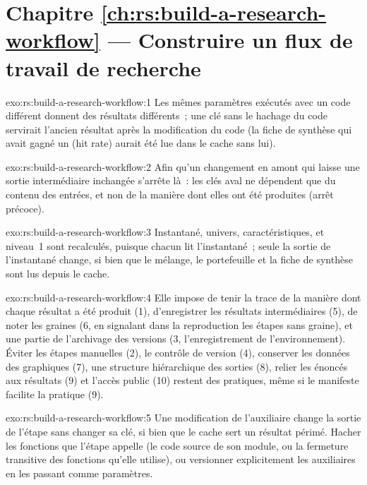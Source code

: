 \section*{Chapitre \ref{ch:rs:build-a-research-workflow} --- Construire un flux de travail de recherche}

\begin{solution}{exo:rs:build-a-research-workflow:1}
Les mêmes paramètres exécutés avec un code différent donnent des résultats différents~; une clé sans le hachage du code servirait l'ancien résultat après la modification du code (la
fiche de synthèse qui avait gagné un  (hit rate) aurait été lue dans le cache sans lui).
\end{solution}

\begin{solution}{exo:rs:build-a-research-workflow:2}
Afin qu'un changement en amont qui laisse une sortie intermédiaire inchangée s'arrête là~: les clés aval ne dépendent que du contenu des entrées, et non de la manière
dont elles ont été produites (arrêt précoce).
\end{solution}

\begin{solution}{exo:rs:build-a-research-workflow:3}
Instantané, univers, caractéristiques,  et niveau~1 sont recalculés, puisque chacun lit l'instantané~; seule la sortie de l'instantané change, si bien que le mélange, le portefeuille et la fiche de synthèse
sont lus depuis le cache.
\end{solution}

\begin{solution}{exo:rs:build-a-research-workflow:4}
Elle impose de tenir la trace de la manière dont chaque résultat a été produit (1), d'enregistrer les résultats intermédiaires (5), de noter les graines (6, en signalant
dans la reproduction les étapes sans graine), et une partie de l'archivage des versions (3, l'enregistrement de l'environnement). Éviter les étapes manuelles (2), le contrôle de version (4), conserver les données des graphiques (7), une structure hiérarchique
des sorties (8), relier les énoncés aux résultats (9) et l'accès public (10) restent des pratiques, même si le manifeste facilite la pratique (9).
\end{solution}

\begin{solution}{exo:rs:build-a-research-workflow:5}
Une modification de l'auxiliaire change la sortie de l'étape sans changer sa clé, si bien que le cache sert un résultat périmé. Hacher les fonctions que l'étape appelle (le code source de son
module, ou la fermeture transitive des fonctions qu'elle utilise), ou versionner explicitement les auxiliaires en les passant comme paramètres.
\end{solution}

